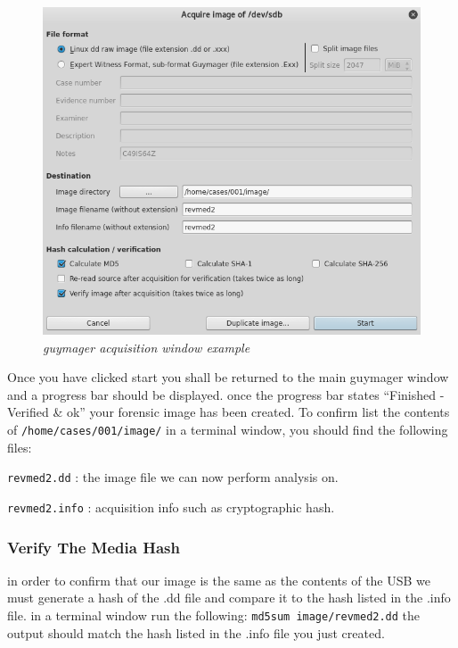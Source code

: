 \documentclass[a4paper,11pt]{article}
\begin{document}
\begin{figure}
	\centering
	\includegraphics[scale=0.5]{guymager-aquisition-window}
	\caption{\textit{guymager acquisition window example}}
	\label{fig:guymager-aquisition-window}
\end{figure}

Once you have clicked start you shall be returned to the main guymager window and a progress bar should be displayed. once the progress bar states ``Finished - Verified {\&} ok'' your forensic image has been created. To confirm list the contents of \texttt{/home/cases/001/image/} in a terminal window, you should find the following files: 
\begin{itemize*}
\item \texttt{revmed2.dd} : the image file we can now perform analysis on.
\item \texttt{revmed2.info} : acquisition info such as cryptographic hash.
\end{itemize*}

\subsubsection*{Verify The Media Hash}
in order to confirm that our image is the same as the contents of the USB we must generate a hash of the .dd file and compare it to the hash listed in the .info file.
in a terminal window run the following:
\texttt{md5sum image/revmed2.dd}
the output should match the hash listed in the .info file you just created.
\end{document}
